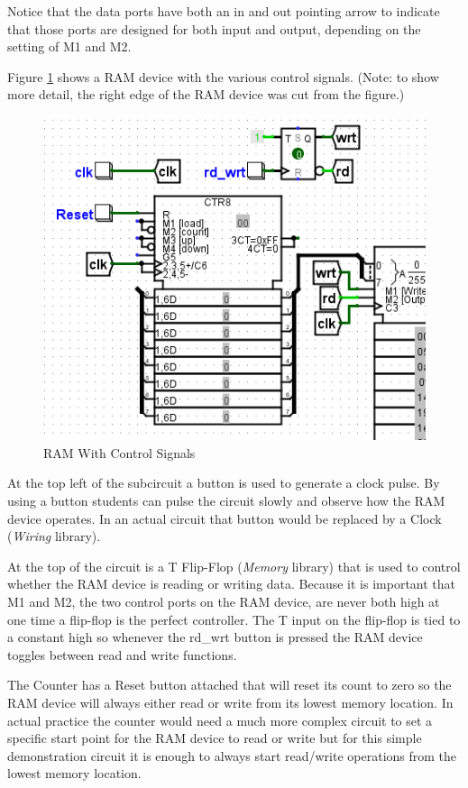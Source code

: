 Notice that the data ports have both an in and out pointing arrow to indicate that those ports are designed for both input and output, depending on the setting of M1 and M2.

Figure \ref{fig:10-02} shows a RAM device with the various control signals. (Note: to show more detail, the right edge of the RAM device was cut from the figure.)

\begin{figure}[H]
	\centering
	\includegraphics[width=\maxwidth{.95\linewidth}]{gfx/10-02}
	\caption{RAM With Control Signals}
	\label{fig:10-02}
\end{figure}

At the top left of the subcircuit a button is used to generate a clock pulse. By using a button students can pulse the circuit slowly and observe how the RAM device operates. In an actual circuit that button would be replaced by a Clock (\textit{Wiring} library).

At the top of the circuit is a T Flip-Flop (\textit{Memory} library) that is used to control whether the RAM device is reading or writing data. Because it is important that M1 and M2, the two control ports on the RAM device, are never both high at one time a flip-flop is the perfect controller. The T input on the flip-flop is tied to a constant high so whenever the rd\_wrt button is pressed the RAM device toggles between read and write functions.

The Counter has a Reset button attached that will reset its count to zero so the RAM device will always either read or write from its lowest memory location. In actual practice the counter would need a much more complex circuit to set a specific start point for the RAM device to read or write but for this simple demonstration circuit it is enough to always start read/write operations from the lowest memory location.

